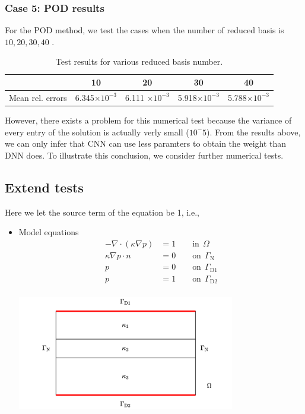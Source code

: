 \subsubsection{Case 5: POD results}
For the POD method, we test the cases when the number of reduced basis is $10, 20, 30 ,40$
.\begin{table}
	\begin{center}
		\begin{tabular}{|c|c|c|c|c|}
			\hline
			& 10 & 20 & 30& 40 \\
			\hline
			Mean rel. errors & 6.345$\times 10^{-3}$ & 6.111 $\times 10^{-3}$ &5.918$\times 10^{-3}$ &5.788$\times 10^{-3}$ \\
			\hline
		\end{tabular}\caption{Test results for various reduced basis number.}
	\end{center}
\end{table}

However, there exists a problem for this numerical test because the variance of every entry  of the solution is actually verly small ($10^-5$). From the results above, we can only infer that CNN can use less paramters to obtain the weight than DNN does. To illustrate this conclusion, we consider further numerical tests.

\subsection{Extend tests}
Here we let the source term of the equation be 1, i.e., 
\begin{itemize}
	\item Model equations
	\begin{align*}
		- \nabla \cdot (\kappa \nabla p) & = 1  \qquad \text{in}~~ \Omega \\
		\kappa \nabla p \cdot n &= 0 \qquad \text{on} ~~ \Gamma_\text{N} \\
		p  &= 0 \qquad \text{on} ~~\Gamma_{\text{D}1} \\
		p  &= 1 \qquad \text{on}~~ \Gamma_{\text{D}2} \\
	\end{align*}
	\begin{center}
		\vskip -20pt
		\includegraphics[height=5cm]{figures/Darcy_CNN/Darcy_domain.png}
	\end{center}
\end{itemize}

